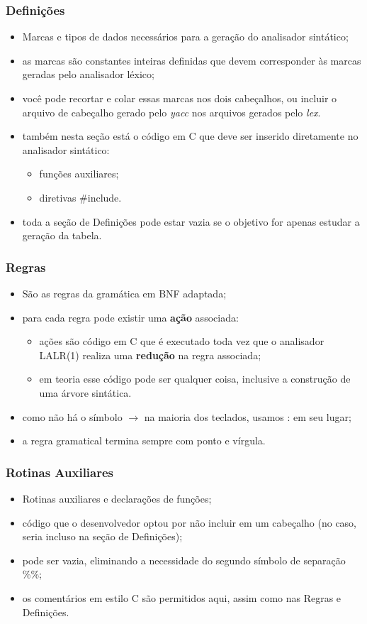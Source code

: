 \documentclass[table]{beamer}
\begin{document}
   \begin{frame}
   \frametitle{Definições}
   \begin{itemize}
      \item Marcas e tipos de dados necessários para a geração do analisador sintático;
      \item as marcas são constantes inteiras definidas que devem corresponder às marcas geradas pelo analisador léxico;
      \item você pode recortar e colar essas marcas nos dois cabeçalhos, ou incluir o arquivo de cabeçalho gerado pelo \textit{yacc} nos arquivos gerados pelo \textit{lex}.
      \item também nesta seção está o código em C que deve ser inserido diretamente no analisador sintático:
      \begin{itemize}
         \item funções auxiliares;
         \item diretivas \#include.
      \end{itemize}
      \item toda a seção de Definições pode estar vazia se o objetivo for apenas estudar a geração da tabela.
   \end{itemize}
\end{frame}

\begin{frame}
   \frametitle{Regras}
   \begin{itemize}
      \item São as regras da gramática em BNF adaptada;
      \item para cada regra pode existir uma \textbf{ação} associada:
      \begin{itemize}
         \item ações são código em C que é executado toda vez que o analisador LALR(1) realiza uma \textbf{redução} na regra associada;
         \item em teoria esse código pode ser qualquer coisa, inclusive a construção de uma árvore sintática.
      \end{itemize}
      \item como não há o símbolo $\rightarrow$ na maioria dos teclados, usamos : em seu lugar;
      \item a regra gramatical termina sempre com ponto e vírgula. 
   \end{itemize}
\end{frame}

\begin{frame}
   \frametitle{Rotinas Auxiliares}
   \begin{itemize}
      \item Rotinas auxiliares e declarações de funções;
      \item código que o desenvolvedor optou por não incluir em um cabeçalho (no caso, seria incluso na seção de Definições);
      \item pode ser vazia, eliminando a necessidade do segundo símbolo de separação \%\%;
      \item os comentários em estilo C são permitidos aqui, assim como nas Regras e Definições.
   \end{itemize}
\end{frame}
\end{document}
